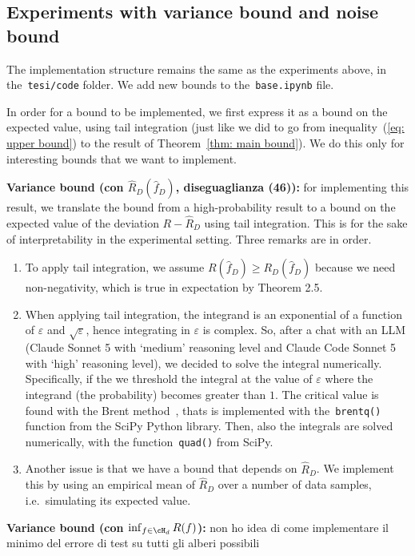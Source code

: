 \subsection{Experiments with variance bound and noise bound}

The implementation structure remains the same as the experiments above, in the~\texttt{tesi/code} folder. We add new bounds to the~\texttt{base.ipynb} file. 

In order for a bound to be implemented, we first express it as a bound on the expected value, using tail integration (just like we did to go from inequality~(\ref{eq: upper bound}) to the result of Theorem~\ref{thm: main bound}). We do this only for interesting bounds that we want to implement. 

{\bf Variance bound (con $\hat R_D (\hat f_D)$, diseguaglianza (46)):} for implementing this result, we translate the bound from a high-probability result to a bound on the expected value of the deviation $R-\hat R_D$ using tail integration. This is for the sake of interpretability in the experimental setting. 
Three remarks are in order. 
\begin{enumerate}
    \item To apply tail integration, we assume $R(\hat f_D)\ge R_D(\hat f_D)$ because we need non-negativity, which is true in expectation by Theorem 2.5.
    \item When applying tail integration, the integrand is an exponential of a function of $\varepsilon$ and $\sqrt\varepsilon$, hence integrating in $\varepsilon$ is complex. So, after a chat with an LLM (Claude Sonnet 5 with `medium' reasoning level and Claude Code Sonnet 5 with `high' reasoning level), we decided to solve the integral numerically. Specifically, if the we threshold the integral at the value of $\varepsilon$ where the integrand (the probability) becomes greater than $1$. The critical value is found with the Brent method~\cite{Brent1973}, thats is implemented with the~\texttt{brentq()} function from the SciPy Python library. Then, also the integrals are solved numerically, with the function~\texttt{quad()} from SciPy. 
    \item Another issue is that we have a bound that depends on $\hat R_D$. We implement this by using an empirical mean of $\hat R_D$ over a number of data samples, i.e.\ simulating its expected value. 
\end{enumerate}


{\bf Variance bound (con $\inf_{f\in\cH_d} R(f)$):} non ho idea di come implementare il minimo del errore di test su tutti gli alberi possibili

